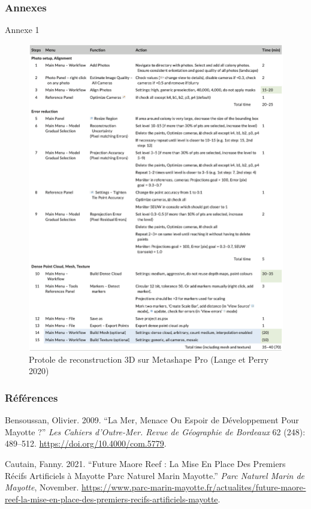 \documentclass[]{article}
\begin{document}
\hypertarget{annexes}{%
\subsubsection{Annexes}\label{annexes}}

Annexe 1

\begin{figure}

{\centering \includegraphics[width=0.6\linewidth]{images/protocol} 

}

\caption{Protole de reconstruction 3D sur Metashape Pro (Lange et Perry 2020)}\label{fig:unnamed-chunk-4}
\end{figure}

\hypertarget{ruxe9fuxe9rences}{%
\subsubsection*{Références}\label{ruxe9fuxe9rences}}

\hypertarget{refs}{}
\leavevmode\hypertarget{ref-bensoussan_mer_2009}{}%
Bensoussan, Olivier. 2009. ``La Mer, Menace Ou Espoir de Développement
Pour Mayotte ?'' \emph{Les Cahiers d'Outre-Mer. Revue de Géographie de
Bordeaux} 62 (248): 489--512. \url{https://doi.org/10.4000/com.5779}.

\leavevmode\hypertarget{ref-cautain_future_2021}{}%
Cautain, Fanny. 2021. ``Future Maore Reef : La Mise En Place Des
Premiers Récifs Artificiels à Mayotte Parc Naturel Marin Mayotte.''
\emph{Parc Naturel Marin de Mayotte}, November.
\url{https://www.parc-marin-mayotte.fr/actualites/future-maore-reef-la-mise-en-place-des-premiers-recifs-artificiels-mayotte}.
\end{document}
